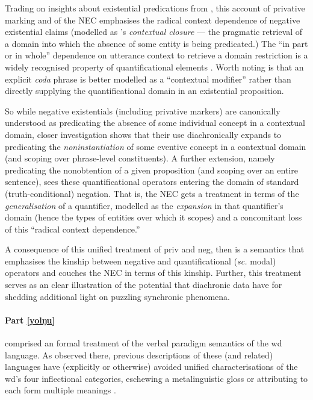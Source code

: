 \documentclass[11pt,dvipsnames]{report}
\begin{document}
Trading on insights about existential predications from \citet{Francez2007,Francez2009}, this account of privative marking and of the \acrshort{NEC} emphasises the radical context dependence of negative existential claims (modelled as \citeauthor{Francez2007}'s \textit{contextual closure} --- the pragmatic retrieval of a domain into which the absence of some entity is being predicated.) The ``in part or in whole'' dependence on utterance context to retrieve a domain restriction is a widely recognised property of quantificational elements \citep[see][661]{Roberts1995}. Worth noting is that an explicit \textit{coda} phrase is better modelled as a ``contextual modifier'' rather than directly supplying the quantificational domain in an existential proposition.

So while negative existentials (including privative markers) are canonically understood as predicating the absence of some individual concept in a contextual domain, closer investigation shows that their use diachronically expands to predicating the \textit{noninstantiation} of some eventive concept in a contextual domain (and scoping over phrase-level constituents). A further extension, namely predicating the nonobtention of a given proposition (and scoping over an entire sentence), sees these quantificational operators entering the domain of standard (truth-conditional) negation. That is, the \acrshort{NEC} gets a treatment in terms of the \textit{generalisation} of a quantifier, modelled as the \textit{expansion} in that quantifier's domain (hence the types of entities over which it scopes) and a concomitant loss of this ``radical context dependence.''

 A consequence of this unified treatment of \gls{priv} and \gls{neg}, then is a semantics that emphasises the kinship between negative and quantificational (\textit{sc.} modal) operators and couches the \acrshort{NEC} in terms of this kinship. Further, this treatment serves as an clear illustration of the potential that diachronic data have for shedding additional light on puzzling synchronic phenomena.

\paragraph{Part \textbf{\ref{yolŋu}}} comprised an formal treatment of the verbal paradigm semantics of the \acrlong{wd} language. As observed there, previous descriptions of these (and related) languages have (explicitly or otherwise) avoided unified characterisations of the \acrshort{wd}'s four inflectional categories, eschewing a metalinguistic gloss \citep[\textit{e.g.},][]{Lowe1996} or attributing to each form multiple meanings \citep[\textit{e.g.},][]{Waters1989}.
\end{document}
